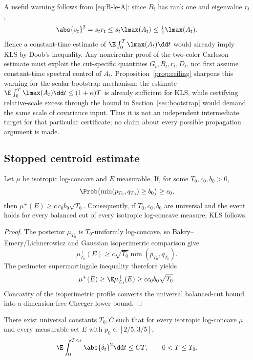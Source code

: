 \documentclass[../../main.tex]{subfiles}
\begin{document}
A useful warning follows from \eqref{eq:B-le-A}: since $B_t$ has rank one and eigenvalue $r_t$,
\begin{equation}\label{eq:trivial-lambda}
  \abs{v_t}^2=s_tr_t\le s_t\lmax(A_t)\le\tfrac14\lmax(A_t).
\end{equation}
Hence a constant-time estimate of $\E\int_0^T\lmax(A_t)\dd t$ would already imply KLS by
Doob's inequality. Any noncircular proof of the two-color Carleson estimate must exploit the
cut-specific quantities $G_t,B_t,r_t,D_t$, not first assume constant-time spectral control of
$A_t$. Proposition~\ref{prop:ceiling} sharpens this warning for the scalar-bootstrap mechanism:
the estimate $\E\int_0^T\lmax(A_t)\dd t\le(1+\kappa)T$ is already sufficient for KLS, while
certifying relative-scale excess through the bound in Section~\ref{sec:bootstrap} would demand
the same scale of covariance input. Thus it is not an independent intermediate target for that
particular certificate; no claim about every possible propagation argument is made.

\subsection{Stopped centroid estimate}

\begin{lemma}
\label{lem:survival-implies-kls}
Let $\mu$ be isotropic log-concave and $E$ measurable. If, for some $T_0,c_0,b_0>0$,
\[
  \Prob\bigl(\min(p_{T_0},q_{T_0})\ge b_0\bigr)\ge c_0,
\]
then $\mu^+(E)\ge c\,c_0b_0\sqrt{T_0}$. Consequently, if $T_0,c_0,b_0$ are universal and the
event holds for every balanced cut of every isotropic log-concave measure, KLS follows.
\end{lemma}

\begin{proof}
The posterior $\mu_{T_0}$ is $T_0$-uniformly log-concave, so
Bakry--Emery/Lichnerowicz and Gaussian isoperimetric comparison
give \cite{BakryGentilLedoux2014,Bobkov1999LogConcave,Milman2009Isoperimetric}
\[
  \mu_{T_0}^+(E)\ge c\sqrt{T_0}\min(p_{T_0},q_{T_0}).
\]
The perimeter supermartingale inequality therefore yields
\[
  \mu^+(E)\ge\E\mu_{T_0}^+(E)
  \ge c c_0b_0\sqrt{T_0}.
\]
Concavity of the isoperimetric profile converts the universal balanced-cut bound into a
dimension-free Cheeger lower bound.
\end{proof}

\begin{assumption}
\label{ass:stopped-centroid}
There exist universal constants $T_0,C$ such that for every isotropic log-concave $\mu$ and every
measurable set $E$ with $p_0\in[2/5,3/5]$,
\begin{equation}\label{eq:stopped-centroid}
  \E\int_0^{T\wedge\tau}\abs{\delta_t}^2\dd t\le CT,
  \qquad 0<T\le T_0 .
\end{equation}
\end{assumption}
\end{document}
